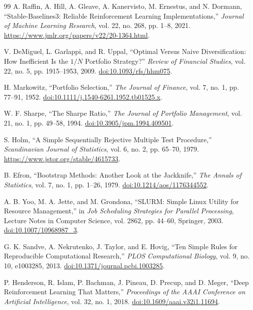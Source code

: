 \documentclass[12pt,a4paper,oneside]{book}
\begin{document}
\begin{thebibliography}{99}
A. Raffin, A. Hill, A. Gleave, A. Kanervisto, M. Ernestus, and N. Dormann, “Stable-Baselines3: Reliable Reinforcement Learning Implementations,” \emph{Journal of Machine Learning Research}, vol. 22, no. 268, pp. 1--8, 2021. \url{https://www.jmlr.org/papers/v22/20-1364.html}.

V. DeMiguel, L. Garlappi, and R. Uppal, “Optimal Versus Naive Diversification: How Inefficient Is the $1/N$ Portfolio Strategy?” \emph{Review of Financial Studies}, vol. 22, no. 5, pp. 1915--1953, 2009. \href{https://doi.org/10.1093/rfs/hhm075}{doi:10.1093/rfs/hhm075}.

H. Markowitz, “Portfolio Selection,” \emph{The Journal of Finance}, vol. 7, no. 1, pp. 77--91, 1952. \href{https://doi.org/10.1111/j.1540-6261.1952.tb01525.x}{doi:10.1111/j.1540-6261.1952.tb01525.x}.

W. F. Sharpe, “The Sharpe Ratio,” \emph{The Journal of Portfolio Management}, vol. 21, no. 1, pp. 49--58, 1994. \href{https://doi.org/10.3905/jpm.1994.409501}{doi:10.3905/jpm.1994.409501}.

S. Holm, “A Simple Sequentially Rejective Multiple Test Procedure,” \emph{Scandinavian Journal of Statistics}, vol. 6, no. 2, pp. 65--70, 1979. \url{https://www.jstor.org/stable/4615733}.

B. Efron, “Bootstrap Methods: Another Look at the Jackknife,” \emph{The Annals of Statistics}, vol. 7, no. 1, pp. 1--26, 1979. \href{https://doi.org/10.1214/aos/1176344552}{doi:10.1214/aos/1176344552}.

A. B. Yoo, M. A. Jette, and M. Grondona, “SLURM: Simple Linux Utility for Resource Management,” in \emph{Job Scheduling Strategies for Parallel Processing}, Lecture Notes in Computer Science, vol. 2862, pp. 44--60, Springer, 2003. \href{https://doi.org/10.1007/10968987_3}{doi:10.1007/10968987\_3}.

G. K. Sandve, A. Nekrutenko, J. Taylor, and E. Hovig, “Ten Simple Rules for Reproducible Computational Research,” \emph{PLOS Computational Biology}, vol. 9, no. 10, e1003285, 2013. \href{https://doi.org/10.1371/journal.pcbi.1003285}{doi:10.1371/journal.pcbi.1003285}.

P. Henderson, R. Islam, P. Bachman, J. Pineau, D. Precup, and D. Meger, “Deep Reinforcement Learning That Matters,” \emph{Proceedings of the AAAI Conference on Artificial Intelligence}, vol. 32, no. 1, 2018. \href{https://doi.org/10.1609/aaai.v32i1.11694}{doi:10.1609/aaai.v32i1.11694}.


\end{thebibliography}
\end{document}
